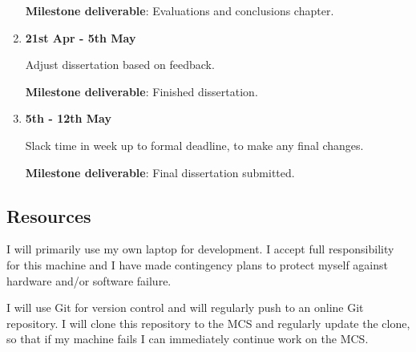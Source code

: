 \begin{enumerate}
  \textbf{Milestone deliverable}: Evaluations and conclusions chapter.

\item\textbf{21st Apr - 5th May}

  Adjust dissertation based on feedback.

  \textbf{Milestone deliverable}: Finished dissertation.

\item \textbf{5th - 12th May}

  Slack time in week up to formal deadline, to make any final changes.

  \textbf{Milestone deliverable}: Final dissertation submitted.

\end{enumerate}

\subsection*{Resources}

I will primarily use my own laptop for development. I accept full responsibility for this machine and I have made contingency plans to protect myself against hardware and/or software failure.

I will use Git for version control and will regularly push to an online Git repository. I will clone this repository to the MCS and regularly update the clone, so that if my machine fails I can immediately continue work on the MCS.


